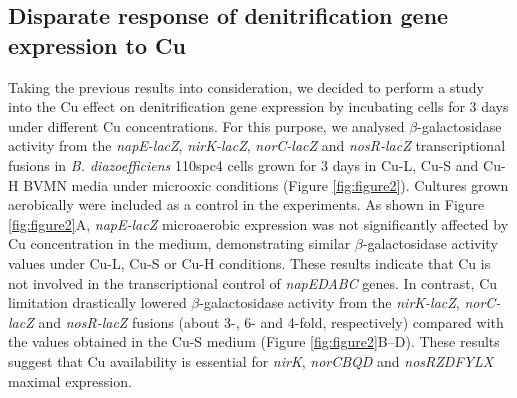 \documentclass[a4paper,11pt]{article}
\begin{document}
\subsection{Disparate response of denitrification gene expression to Cu}
Taking the previous results into consideration, we decided to perform a study into the Cu
effect on denitrification gene expression by incubating cells for 3 days under different Cu
concentrations. For this purpose, we analysed $\beta$-galactosidase activity from the {\em napE-lacZ},
{\em nirK-lacZ}, {\em norC-lacZ} and {\em nosR-lacZ} transcriptional fusions in {\em B. diazoefficiens} 110spc4 cells
grown for 3 days in Cu-L, Cu-S and Cu-H BVMN media under microoxic conditions
(Figure \ref{fig:figure2}). Cultures grown aerobically were included as a control in the experiments. As
shown in Figure \ref{fig:figure2}A, {\em napE-lacZ} microaerobic expression was not significantly affected by
Cu concentration in the medium, demonstrating similar $\beta$-galactosidase activity values
under Cu-L, Cu-S or Cu-H conditions. These results indicate that Cu is not involved
in the transcriptional control of {\em napEDABC} genes. In contrast, Cu limitation drastically
lowered $\beta$-galactosidase activity from the {\em nirK-lacZ}, {\em norC-lacZ} and {\em nosR-lacZ} fusions (about
3-, 6- and 4-fold, respectively) compared with the values obtained in the Cu-S medium
(Figure \ref{fig:figure2}B–D). These results suggest that Cu availability is essential for {\em nirK}, {\em norCBQD}
and {\em nosRZDFYLX} maximal expression.
\end{document}
